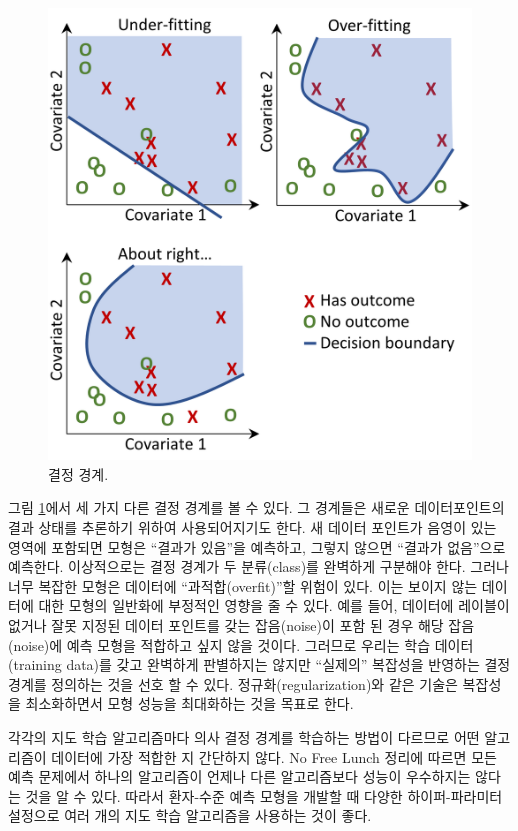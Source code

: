 \documentclass[11pt]{book}
\theoremstyle{definition}
\theoremstyle{definition}
\theoremstyle{definition}
\theoremstyle{remark}
\begin{document}
\begin{figure}

{\centering \includegraphics[width=0.8\linewidth]{images/PatientLevelPrediction/decisionBoundary} 

}

\caption{결정 경계.}\label{fig:decisionBoundary}
\end{figure}

그림 \ref{fig:decisionBoundary}에서 세 가지 다른 결정 경계를 볼 수 있다.
그 경계들은 새로운 데이터포인트의 결과 상태를 추론하기 위하여
사용되어지기도 한다. 새 데이터 포인트가 음영이 있는 영역에 포함되면
모형은 ``결과가 있음''을 예측하고, 그렇지 않으면 ``결과가 없음''으로
예측한다. 이상적으로는 결정 경계가 두 분류(class)를 완벽하게 구분해야
한다. 그러나 너무 복잡한 모형은 데이터에 ``과적합(overfit)''할 위험이
있다. 이는 보이지 않는 데이터에 대한 모형의 일반화에 부정적인 영향을 줄
수 있다. 예를 들어, 데이터에 레이블이 없거나 잘못 지정된 데이터 포인트를
갖는 잡음(noise)이 포함 된 경우 해당 잡음(noise)에 예측 모형을 적합하고
싶지 않을 것이다. 그러므로 우리는 학습 데이터(training data)를 갖고
완벽하게 판별하지는 않지만 ``실제의'' 복잡성을 반영하는 결정 경계를
정의하는 것을 선호 할 수 있다. 정규화(regularization)와 같은 기술은
복잡성을 최소화하면서 모형 성능을 최대화하는 것을 목표로 한다.

각각의 지도 학습 알고리즘마다 의사 결정 경계를 학습하는 방법이 다르므로
어떤 알고리즘이 데이터에 가장 적합한 지 간단하지 않다. No Free Lunch
정리에 따르면 모든 예측 문제에서 하나의 알고리즘이 언제나 다른
알고리즘보다 성능이 우수하지는 않다는 것을 알 수
있다. 따라서 환자-수준 예측 모형을 개발할 때 다양한
하이퍼-파라미터 설정으로 여러 개의 지도 학습 알고리즘을 사용하는 것이
좋다.
\end{document}
